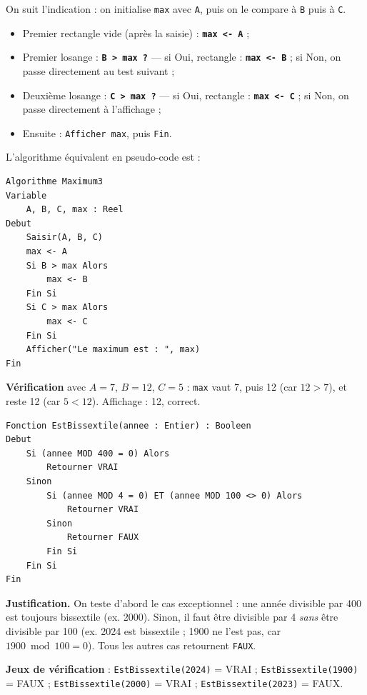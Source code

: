 \documentclass[11pt]{article}
\begin{document}
\begin{corrige}
On suit l'indication : on initialise \texttt{max} avec \texttt{A}, puis on le compare à \texttt{B} puis à \texttt{C}.
\begin{itemize}
    \item Premier rectangle vide (après la saisie) : \textbf{\texttt{max <- A}} ;
    \item Premier losange : \textbf{\texttt{B > max ?}} — si Oui, rectangle : \textbf{\texttt{max <- B}} ; si Non, on passe directement au test suivant ;
    \item Deuxième losange : \textbf{\texttt{C > max ?}} — si Oui, rectangle : \textbf{\texttt{max <- C}} ; si Non, on passe directement à l'affichage ;
    \item Ensuite : \texttt{Afficher max}, puis \texttt{Fin}.
\end{itemize}
L'algorithme équivalent en pseudo-code est :
\begin{lstlisting}
Algorithme Maximum3
Variable
    A, B, C, max : Reel
Debut
    Saisir(A, B, C)
    max <- A
    Si B > max Alors
        max <- B
    Fin Si
    Si C > max Alors
        max <- C
    Fin Si
    Afficher("Le maximum est : ", max)
Fin
\end{lstlisting}
\textbf{Vérification} avec $A = 7$, $B = 12$, $C = 5$ : \texttt{max} vaut 7, puis 12 (car $12 > 7$), et reste 12 (car $5 < 12$). Affichage : 12, correct.
\end{corrige}

\begin{corrige}
\begin{lstlisting}
Fonction EstBissextile(annee : Entier) : Booleen
Debut
    Si (annee MOD 400 = 0) Alors
        Retourner VRAI
    Sinon
        Si (annee MOD 4 = 0) ET (annee MOD 100 <> 0) Alors
            Retourner VRAI
        Sinon
            Retourner FAUX
        Fin Si
    Fin Si
Fin
\end{lstlisting}
\textbf{Justification.} On teste d'abord le cas exceptionnel : une année divisible par 400 est toujours bissextile (ex. 2000). Sinon, il faut être divisible par 4 \emph{sans} être divisible par 100 (ex. 2024 est bissextile ; 1900 ne l'est pas, car $1900 \bmod 100 = 0$). Tous les autres cas retournent \texttt{FAUX}.

\textbf{Jeux de vérification} : \texttt{EstBissextile(2024)} = VRAI ; \texttt{EstBissextile(1900)} = FAUX ; \texttt{EstBissextile(2000)} = VRAI ; \texttt{EstBissextile(2023)} = FAUX.
\end{corrige}
\end{document}
